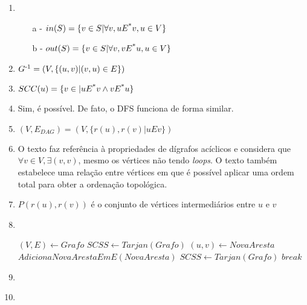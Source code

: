 \documentclass[11pt]{article}
\begin{document}
\begin{enumerate}
    \item  \hfill \\
        \begin{enumerate}
            \item[a] - $in(S) = \{v \in S | \forall v, uE\textsuperscript{*} v, u \in V \}$
            \item[b] - $out(S) = \{v \in S | \forall v, vE\textsuperscript{*} u, u \in V \}$
        \end{enumerate}
    \item $G\textsuperscript{-1} = (V, \{(u,v) | (v,u) \in E\})$
    \item $SCC(u) = \{v \in | uE\textsuperscript{*}v \land vE\textsuperscript{*}u\}$
    \item Sim, é possível. De fato, o DFS funciona de forma similar.
    \item $(V, E_{DAG}) = (V, \{r(u),r(v)|uEv\})$
    \item O texto faz referência à propriedades de dígrafos acíclicos e considera que $\forall v \in V, \exists (v,v)$, mesmo os vértices não tendo \textit{loops}. O texto também estabelece uma relação entre vértices em que é possível aplicar uma ordem total para obter a ordenação topológica.
    \item $P(r(u),r(v))$ é o conjunto de vértices intermediários entre $u$ e $v$
    \item \hfill \\
        \begin{algorithmic}
                \State $(V,E)\gets Grafo$
                \State $SCSS\gets Tarjan(Grafo)$
                \State $(u,v) \gets NovaAresta$
                \State $AdicionaNovaArestaEmE(NovaAresta)$
                            \State $SCSS\gets Tarjan(Grafo)$
                            \State $break$
                        \EndIf
                    \EndFor
                \EndFor
            \EndFunction
        \end{algorithmic}
    \item \hfill \\
        \EndFunction
    \item
\end{enumerate}
\end{document}
